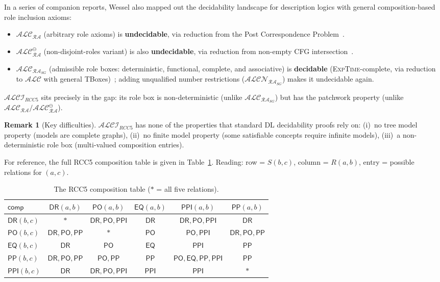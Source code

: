\documentclass[
]{ceurart}
\theoremstyle{definition}
\newtheorem{remark}[theorem]{Remark}
\newcommand{\ALC}{\ensuremath{\mathcal{ALC}}}
\newcommand{\ALCIRCC}[1]{\ensuremath{\mathcal{ALCI}_{\mathit{RCC#1}}}}
\newcommand{\DR}{\ensuremath{\mathsf{DR}}}
\newcommand{\PO}{\ensuremath{\mathsf{PO}}}
\newcommand{\EQ}{\ensuremath{\mathsf{EQ}}}
\newcommand{\PP}{\ensuremath{\mathsf{PP}}}
\newcommand{\PPI}{\ensuremath{\mathsf{PPI}}}
\newcommand{\comp}{\ensuremath{\mathsf{comp}}}
\newcommand{\EXPTIME}{\textsc{ExpTime}}
\begin{document}
In a series of companion reports, Wessel also mapped out the
decidability landscape for description logics with general
composition-based role inclusion axioms:
\begin{itemize}
  \item $\ALC_{\mathcal{RA}}$ (arbitrary role axioms) is
    \textbf{undecidable}, via reduction from the Post
    Correspondence Problem~\cite{Wessel2001RA}.
  \item $\ALC_{\mathcal{RA}}^\ominus$ (non-disjoint-roles
    variant) is also \textbf{undecidable}, via reduction from
    non-empty CFG intersection~\cite{Wessel2000RA}.
  \item $\ALC_{\mathcal{RA}_{SG}}$ (admissible role boxes:
    deterministic, functional, complete, and associative) is
    \textbf{decidable} (\EXPTIME-complete, via reduction to
    $\ALC$ with general TBoxes)~\cite{Wessel2000SG}; adding
    unqualified number restrictions ($\mathcal{ALCN}_{\mathcal{RA}_{SG}}$)
    makes it undecidable again.
\end{itemize}
$\ALCIRCC{5}$ sits precisely in the gap: its role box is
non-deterministic (unlike $\ALC_{\mathcal{RA}_{SG}}$) but
has the patchwork property (unlike
$\ALC_{\mathcal{RA}}/\ALC_{\mathcal{RA}}^\ominus$).

\begin{remark}[Key difficulties]
$\ALCIRCC{5}$ has none of the properties that standard DL
decidability proofs rely on:
(i)~no tree model property (models are complete graphs),
(ii)~no finite model property (some satisfiable concepts require
infinite models),
(iii)~a non-deterministic role box (multi-valued composition entries).
\end{remark}

For reference, the full RCC5 composition table is given in
Table~\ref{tab:comp}.  Reading: row = $S(b,c)$, column = $R(a,b)$,
entry = possible relations for $(a,c)$.

\begin{table}[ht]
\centering
\caption{The RCC5 composition table ($*$ = all five relations).}
\label{tab:comp}
\renewcommand{\arraystretch}{1.15}
\begin{tabular}{l|ccccc}
\toprule
$\comp$ & $\DR(a,b)$ & $\PO(a,b)$ & $\EQ(a,b)$ & $\PPI(a,b)$ & $\PP(a,b)$ \\
\midrule
$\DR(b,c)$ & $*$ & $\DR,\PO,\PPI$ & $\DR$ & $\DR,\PO,\PPI$ & $\DR$ \\
$\PO(b,c)$ & $\DR,\PO,\PP$ & $*$ & $\PO$ & $\PO,\PPI$ & $\DR,\PO,\PP$ \\
$\EQ(b,c)$ & $\DR$ & $\PO$ & $\EQ$ & $\PPI$ & $\PP$ \\
$\PP(b,c)$ & $\DR,\PO,\PP$ & $\PO,\PP$ & $\PP$ & $\PO,\EQ,\PP,\PPI$ & $\PP$ \\
$\PPI(b,c)$ & $\DR$ & $\DR,\PO,\PPI$ & $\PPI$ & $\PPI$ & $*$ \\
\bottomrule
\end{tabular}
\end{table}
\end{document}
